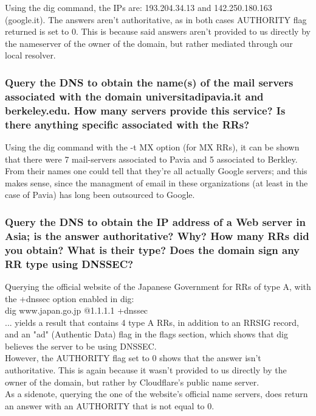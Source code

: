 \documentclass[a4paper,10pt]{article}
\begin{document}
Using the dig command, the IPs are: 193.204.34.13 and 142.250.180.163 (google.it). The answers aren't authoritative, as in both cases AUTHORITY flag returned is set to 0. This is because said answers aren't provided to us directly by the nameserver of the owner of the domain, but rather mediated through our local resolver.

\subsubsection{Query the DNS to obtain the name(s) of the mail servers associated with the
domain universitadipavia.it and berkeley.edu. How many servers
provide this service? Is there anything specific associated with the RRs?}

Using the dig command with the -t MX option (for MX RRs), it can be shown that there were 7 mail-servers associated to Pavia and 5 associated to Berkley. From their names one could tell that they're all actually Google servers; and this makes sense, since the managment of email in these organizations (at least in the case of Pavia) has long been outsourced to Google.


\subsubsection{Query the DNS to obtain the IP address of a Web server in Asia; is the answer
authoritative? Why? How many RRs did you obtain? What is their type? Does the
domain sign any RR type using DNSSEC?}

Querying the official website of the Japanese Government for RRs of type A, with the +dnssec option enabled in dig:\\

dig www.japan.go.jp @1.1.1.1 +dnssec\\

... yields a result that contains 4 type A RRs, in addition to an RRSIG record, and an "ad" (Authentic Data) flag in the flags section, which shows that dig believes the server to be using DNSSEC. \\

However, the AUTHORITY flag set to 0 shows that the answer isn't authoritative. This is again because it wasn't provided to us directly by the owner of the domain, but rather by Cloudflare's public name server.\\


As a sidenote, querying the one of the website's official name servers, does return an answer with an AUTHORITY that is not equal to 0.\\
\end{document}
